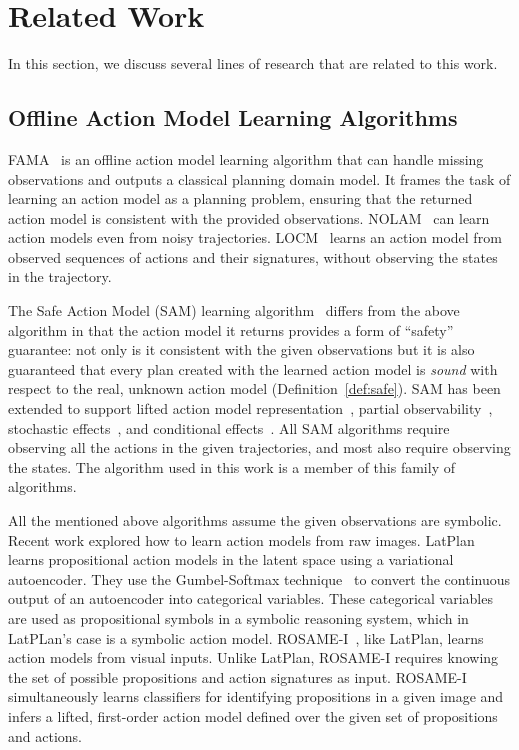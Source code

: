 \section{Related Work}
\label{sec:related-work}
In this section, we discuss several lines of research that are related to this work. 

\subsection{Offline Action Model Learning Algorithms}
\label{sec:related-offline-action-model-learning}


FAMA~\citep{aineto2019learning} is an offline action model learning algorithm that can handle missing observations and outputs a classical planning domain model. 
It frames the task of learning an action model as a planning problem, ensuring that the returned action model is consistent with the provided observations.
NOLAM~\citep{Lamanna24} can learn action models even from noisy trajectories. 
LOCM~\citep{cresswell2013acquiring} learns an action model from observed sequences of actions and their signatures, without observing the states in the trajectory.

The Safe Action Model (SAM) learning algorithm~\cite{stern2017efficient,juba2021safe} differs from the above algorithm in that the action model it returns provides a form of ``safety'' guarantee: not only is it consistent with the given observations but it is also guaranteed that every plan created with the learned action model is \emph{sound} with respect to the real, unknown action model (Definition~\ref{def:safe}).
SAM has been extended to support lifted action model representation~\citep{juba2021safe}, partial observability~\citep{le2024learning}, stochastic effects~\citep{juba2022learning}, and conditional effects~\cite{MordochSSJ24}. 
All SAM algorithms require observing all the actions in the given trajectories, and most
also require observing the states. 
The \nsam algorithm used in this work is a member of this family of algorithms. 

All the mentioned above algorithms assume the given observations are symbolic. 
Recent work explored how to learn action models from raw images. 
LatPlan~\citep{asai2018classical} learns propositional action models in the latent space using a variational autoencoder. 
They use the Gumbel-Softmax technique~\citep{jang2017categorical} to convert the continuous output of an autoencoder into categorical variables. 
These categorical variables are used as propositional symbols in a symbolic reasoning system, which in LatPLan's case is a symbolic action model. 
ROSAME-I~\citep{xi2024neuro}, like LatPlan, learns action models from visual inputs. 
Unlike LatPlan, ROSAME-I requires knowing the set of possible propositions and action signatures as input.
ROSAME-I simultaneously learns classifiers for identifying propositions in a given image and infers a lifted, first-order action model defined over the given set of propositions and actions. 



